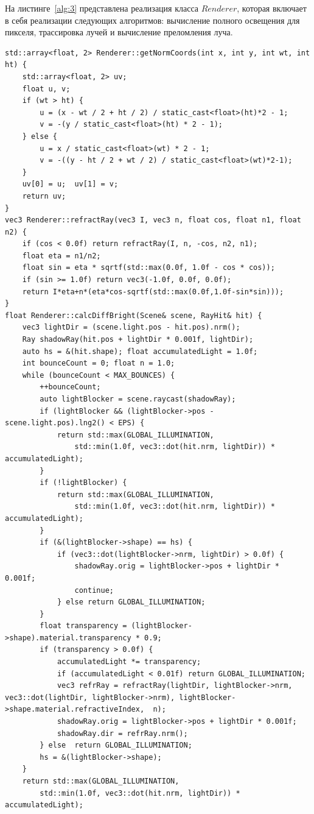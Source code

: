 На листинге~\ref{alg:3} представлена реализация класса $Renderer$, которая включает в себя реализации следующих алгоритмов: вычисление полного освещения для пикселя, трассировка лучей и вычисление преломления луча.

\begin{lstlisting}[label=alg:3, caption=Реализация класса $Renderer$, captionpos=t]
std::array<float, 2> Renderer::getNormCoords(int x, int y, int wt, int ht) {
	std::array<float, 2> uv;
	float u, v;
	if (wt > ht) {
		u = (x - wt / 2 + ht / 2) / static_cast<float>(ht)*2 - 1;
		v = -(y / static_cast<float>(ht) * 2 - 1);
	} else {
		u = x / static_cast<float>(wt) * 2 - 1;
		v = -((y - ht / 2 + wt / 2) / static_cast<float>(wt)*2-1);
	}
	uv[0] = u;  uv[1] = v;
	return uv;
}
vec3 Renderer::refractRay(vec3 I, vec3 n, float cos, float n1, float n2) {
	if (cos < 0.0f) return refractRay(I, n, -cos, n2, n1);
	float eta = n1/n2;
	float sin = eta * sqrtf(std::max(0.0f, 1.0f - cos * cos));
	if (sin >= 1.0f) return vec3(-1.0f, 0.0f, 0.0f); 
	return I*eta+n*(eta*cos-sqrtf(std::max(0.0f,1.0f-sin*sin)));
}
float Renderer::calcDiffBright(Scene& scene, RayHit& hit) {
	vec3 lightDir = (scene.light.pos - hit.pos).nrm();
	Ray shadowRay(hit.pos + lightDir * 0.001f, lightDir);
	auto hs = &(hit.shape); float accumulatedLight = 1.0f;
	int bounceCount = 0; float n = 1.0;
	while (bounceCount < MAX_BOUNCES) {
		++bounceCount;
		auto lightBlocker = scene.raycast(shadowRay);
		if (lightBlocker && (lightBlocker->pos - scene.light.pos).lng2() < EPS) {
			return std::max(GLOBAL_ILLUMINATION,
				std::min(1.0f, vec3::dot(hit.nrm, lightDir)) * accumulatedLight);
		}
		if (!lightBlocker) {
			return std::max(GLOBAL_ILLUMINATION,
				std::min(1.0f, vec3::dot(hit.nrm, lightDir)) * accumulatedLight);
		}
		if (&(lightBlocker->shape) == hs) {
			if (vec3::dot(lightBlocker->nrm, lightDir) > 0.0f) {
				shadowRay.orig = lightBlocker->pos + lightDir * 0.001f;
				continue;
			} else return GLOBAL_ILLUMINATION;
		}
		float transparency = (lightBlocker->shape).material.transparency * 0.9;
		if (transparency > 0.0f) {
			accumulatedLight *= transparency;
			if (accumulatedLight < 0.01f) return GLOBAL_ILLUMINATION;
			vec3 refrRay = refractRay(lightDir, lightBlocker->nrm, vec3::dot(lightDir, lightBlocker->nrm), lightBlocker->shape.material.refractiveIndex,  n);
			shadowRay.orig = lightBlocker->pos + lightDir * 0.001f;
			shadowRay.dir = refrRay.nrm();
		} else	return GLOBAL_ILLUMINATION;
		hs = &(lightBlocker->shape);
	}
	return std::max(GLOBAL_ILLUMINATION,
		std::min(1.0f, vec3::dot(hit.nrm, lightDir)) * accumulatedLight);

\end{lstlisting}
